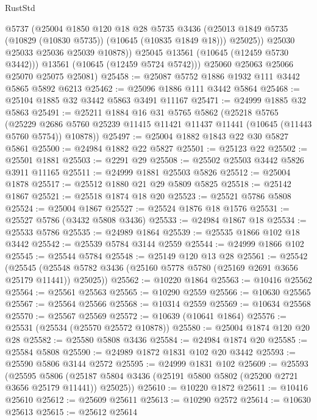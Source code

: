 \begin{lexlean}{RustStd}
\begin{coremodule}
                @5737
                (@25004
                  @1850
                  @120
                  @18
                  @28
                  @5735
                  @3436
                  (@25013 @1849 @5735 (@10829 (@10830 @5735)) (@10645 (@10835 @1849 @18)))
                  @25025))
              @25030
              @25033
              @25036
              @25039
              @10878))
          @25045
          @13561
          (@10645 (@12459 @5730 @3442)))
        @13561
        (@10645 (@12459 @5724 @5742)))
      @25060
      @25063
      @25066
      @25070
      @25075
      @25081)
@25458 := @25087 @5752 @1886 @1932 @111 @3442 @5865 @5892 @6213
@25462 := @25096 @1886 @111 @3442 @5864
@25468 := @25104 @1885 @32 @3442 @5863 @3491 @11167
@25471 := @24999 @1885 @32 @5863
@25491 := @25211
    @1884
    @16
    @31
    @5765
    @5862
    (@25218
      @5765
      (@25229 @2686 @5760 @25239 @11415 @11421 @11437 @11441 (@10645 (@11443 @5760 @5754)) @10878))
@25497 := @25004 @1882 @1843 @22 @30 @5827 @5861
@25500 := @24984 @1882 @22 @5827
@25501 := @25123 @22
@25502 := @25501 @1881
@25503 := @2291 @29
@25508 := @25502 @25503 @3442 @5826 @3911 @11165
@25511 := @24999 @1881 @25503 @5826
@25512 := @25004 @1878
@25517 := @25512 @1880 @21 @29 @5809 @5825
@25518 := @25142 @1867
@25521 := @25518 @1874 @18 @20
@25523 := @25521 @5786 @5808
@25524 := @25004 @1867
@25527 := @25524 @1876 @18 @1576
@25531 := @25527 @5786 (@3432 @5808 @3436)
@25533 := @24984 @1867 @18
@25534 := @25533 @5786
@25535 := @24989 @1864
@25539 := @25535 @1866 @102 @18 @3442
@25542 := @25539 @5784 @3144 @2559
@25544 := @24999 @1866 @102
@25545 := @25544 @5784
@25548 := @25149 @120 @13 @28
@25561 := @25542
    (@25545 (@25548 @5782 @3436 (@25160 @5778 @5780 (@25169 @2691 @3656 @25179 @11441)) @25025))
@25562 := @10220 @1864
@25563 := @10416 @25562
@25564 := @25561 @25563
@25565 := @10290 @2559
@25566 := @10630 @25565
@25567 := @25564 @25566
@25568 := @10314 @2559
@25569 := @10634 @25568
@25570 := @25567 @25569
@25572 := @10639 (@10641 @1864)
@25576 := @25531 (@25534 (@25570 @25572 @10878))
@25580 := @25004 @1874 @120 @20 @28
@25582 := @25580 @5808 @3436
@25584 := @24984 @1874 @20
@25585 := @25584 @5808
@25590 := @24989 @1872 @1831 @102 @20 @3442
@25593 := @25590 @5806 @3144 @2572
@25595 := @24999 @1831 @102
@25609 := @25593
    (@25595
      @5806
      (@25187 @5804 @3436 (@25191 @5800 @5802 (@25200 @2721 @3656 @25179 @11441)) @25025))
@25610 := @10220 @1872
@25611 := @10416 @25610
@25612 := @25609 @25611
@25613 := @10290 @2572
@25614 := @10630 @25613
@25615 := @25612 @25614

\end{coremodule}
\end{lexlean}
